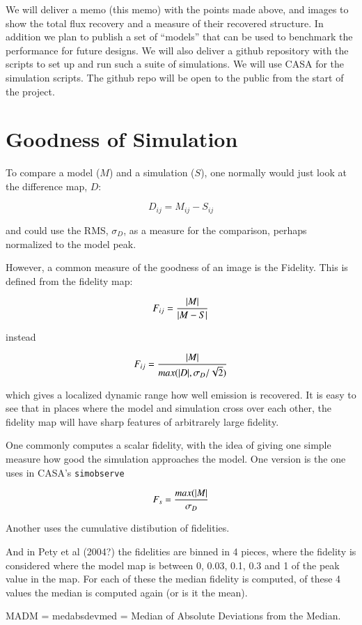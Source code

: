 \documentclass[11pt,twoside]{article}
\begin{document}
We will deliver a memo (this memo) with the points made above, and images to show
the total flux recovery and a measure of their recovered structure. In
addition we plan to publish a set of ``models'' that can be used to
benchmark the performance for future designs. We will also deliver a
github repository with the scripts to set up and run such a suite of
simulations. We will use CASA for the simulation scripts. The github
repo will be open to the public from the start of the project.



\section{Goodness of Simulation}

To compare a model ($M$) and a simulation ($S$), one normally would
just look at the difference map, $D$:

$$
	D_{ij} = M_{ij} - S_{ij}
$$

and could use the RMS, $\sigma_D$, as a measure for the comparison, perhaps
normalized to the model peak.

However, a common measure of the goodness of an image is the
Fidelity. This is defined from the fidelity map:

$$
   F_{ij} = {{|M|} \over {|M-S|} }
$$

instead

$$
   F_{ij} = {    {|M|} \over {max(|D|, \sigma_D/\sqrt{2})} }
$$

which gives a localized dynamic range how well emission is
recovered. It is easy to see that in places where the model and
simulation cross over each other, the fidelity map will have sharp
features of arbitrarely large fidelity.

One commonly computes a scalar fidelity, with the idea of giving one
simple measure how good the simulation approaches the model. One
version is the one uses in CASA's {\tt simobserve}

$$
	F_s = {   {max(|M|} \over {\sigma_D}  }
$$

Another uses the cumulative distibution of fidelities.

And in Pety et al (2004?) the fidelities are binned in 4 pieces, where
the fidelity is considered where the model map is between 0, 0.03,
0.1, 0.3 and 1 of the peak value in the map. For each of these the
median fidelity is computed, of these 4 values the median is computed
again (or is it the mean).

MADM = medabsdevmed = Median of Absolute Deviations from the Median.
\end{document}
